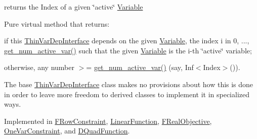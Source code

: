 returns the Index of a given \char`\"{}active\char`\"{} \mbox{\hyperlink{class_s_m_spp__di__unipi__it_1_1_variable}{Variable}} 

Pure virtual method that returns\+:


\begin{DoxyItemize}
\item if this \mbox{\hyperlink{class_s_m_spp__di__unipi__it_1_1_thin_var_dep_interface}{Thin\+Var\+Dep\+Interface}} depends on the given \mbox{\hyperlink{class_s_m_spp__di__unipi__it_1_1_variable}{Variable}}, the index i in 0, ..., \mbox{\hyperlink{group___thin_var_dep_interface___c_l_a_s_s_e_s_ga6dbf09c17736b358d11f617e15856981}{get\+\_\+num\+\_\+active\+\_\+var()}} such that the given \mbox{\hyperlink{class_s_m_spp__di__unipi__it_1_1_variable}{Variable}} is the i-\/th \char`\"{}active\char`\"{} variable;
\item otherwise, any number $>$= \mbox{\hyperlink{group___thin_var_dep_interface___c_l_a_s_s_e_s_ga6dbf09c17736b358d11f617e15856981}{get\+\_\+num\+\_\+active\+\_\+var()}} (say, Inf$<$\+Index$>$()).
\end{DoxyItemize}

The base \mbox{\hyperlink{class_s_m_spp__di__unipi__it_1_1_thin_var_dep_interface}{Thin\+Var\+Dep\+Interface}} class makes no provisions about how this is done in order to leave more freedom to derived classes to implement it in specialized ways. 

Implemented in \mbox{\hyperlink{class_s_m_spp__di__unipi__it_1_1_f_row_constraint_ae2efd3cdf1d4fd41cbafda3c49facfa5}{F\+Row\+Constraint}}, \mbox{\hyperlink{class_s_m_spp__di__unipi__it_1_1_linear_function_a11ab803d076414aa34a02d03a4f6db4d}{Linear\+Function}}, \mbox{\hyperlink{class_s_m_spp__di__unipi__it_1_1_f_real_objective_ae2efd3cdf1d4fd41cbafda3c49facfa5}{F\+Real\+Objective}}, \mbox{\hyperlink{class_s_m_spp__di__unipi__it_1_1_one_var_constraint_a4dbea8d93b14035203b5edce6fd35cfb}{One\+Var\+Constraint}}, and \mbox{\hyperlink{class_s_m_spp__di__unipi__it_1_1_d_quad_function_a5412d6d119f09c9e958bcf0800fcdeaa}{D\+Quad\+Function}}.

\mbox{\label{group___thin_var_dep_interface___c_l_a_s_s_e_s_ga88e11e9f684f5ac81df04df1cf14a423}} 
